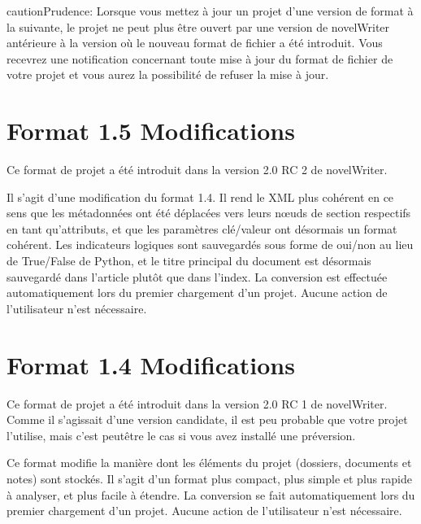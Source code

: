 \documentclass[a4paper,11pt,french]{sphinxmanual}
\begin{document}
\begin{sphinxadmonition}{caution}{Prudence:}
\sphinxAtStartPar
Lorsque vous mettez à jour un projet d’une version de format à la suivante, le projet ne peut plus être ouvert par une version de novelWriter antérieure à la version où le nouveau format de fichier a été introduit. Vous recevrez une notification concernant toute mise à jour du format de fichier de votre projet et vous aurez la possibilité de refuser la mise à jour.
\end{sphinxadmonition}


\section{Format 1.5 Modifications}
\label{\detokenize{more_projectformat:format-1-5-changes}}\label{\detokenize{more_projectformat:a-prjfmt-1-5}}
\sphinxAtStartPar
Ce format de projet a été introduit dans la version 2.0 RC 2 de novelWriter.

\sphinxAtStartPar
Il s’agit d’une modification du format 1.4. Il rend le XML plus cohérent en ce sens que les métadonnées ont été déplacées vers leurs nœuds de section respectifs en tant qu’attributs, et que les paramètres clé/valeur ont désormais un format cohérent. Les indicateurs logiques sont sauvegardés sous forme de oui/non au lieu de True/False de Python, et le titre principal du document est désormais sauvegardé dans l’article plutôt que dans l’index. La conversion est effectuée automatiquement lors du premier chargement d’un projet. Aucune action de l’utilisateur n’est nécessaire.


\section{Format 1.4 Modifications}
\label{\detokenize{more_projectformat:format-1-4-changes}}\label{\detokenize{more_projectformat:a-prjfmt-1-4}}
\sphinxAtStartPar
Ce format de projet a été introduit dans la version 2.0 RC 1 de novelWriter. Comme il s’agissait d’une version candidate, il est peu probable que votre projet l’utilise, mais c’est peut\sphinxhyphen{}être le cas si vous avez installé une préversion.

\sphinxAtStartPar
Ce format modifie la manière dont les éléments du projet (dossiers, documents et notes) sont stockés. Il s’agit d’un format plus compact, plus simple et plus rapide à analyser, et plus facile à étendre. La conversion se fait automatiquement lors du premier chargement d’un projet. Aucune action de l’utilisateur n’est nécessaire.
\end{document}

